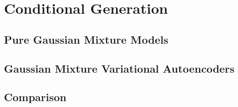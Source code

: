 \section{Conditional Generation}
\subsection{Pure Gaussian Mixture Models}
\subsection{Gaussian Mixture Variational Autoencoders}
\subsection{Comparison}